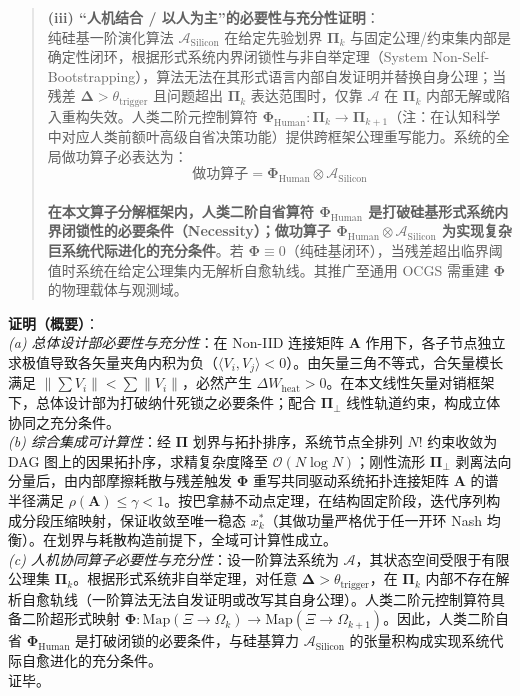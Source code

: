 \documentclass[
]{article}
\begin{document}
\begin{quote}
\textbf{(iii) ``人机结合 / 以人为主''的必要性与充分性证明}：\\
纯硅基一阶演化算法 \(\mathcal{A}_{\mathrm{Silicon}}\) 在给定先验划界
\(\mathbf{\Pi}_k\)
与固定公理/约束集内部是确定性闭环，根据形式系统内界闭锁性与非自举定理（System
Non-Self-Bootstrapping），算法无法在其形式语言内部自发证明并替换自身公理；当残差
\(\mathbf{\Delta} > \theta_{\mathrm{trigger}}\) 且问题超出
\(\mathbf{\Pi}_k\) 表达范围时，仅靠 \(\mathcal{A}\) 在
\(\mathbf{\Pi}_k\) 内部无解或陷入重构失效。人类二阶元控制算符
\(\mathbf{\Phi}_{\mathrm{Human}}: \mathbf{\Pi}_k \to \mathbf{\Pi}_{k+1}\)（注：在认知科学中对应人类前额叶高级自省决策功能）提供跨框架公理重写能力。系统的全局做功算子必表达为：\\
\[\text{做功算子} = \mathbf{\Phi}_{\mathrm{Human}} \otimes \mathcal{A}_{\mathrm{Silicon}}\]\\
\textbf{在本文算子分解框架内，人类二阶自省算符
\(\mathbf{\Phi}_{\mathrm{Human}}\)
是打破硅基形式系统内界闭锁性的必要条件（Necessity）；做功算子
\(\mathbf{\Phi}_{\mathrm{Human}} \otimes \mathcal{A}_{\mathrm{Silicon}}\)
为实现复杂巨系统代际进化的充分条件}。若
\(\mathbf{\Phi} \equiv 0\)（纯硅基闭环），当残差超出临界阈值时系统在给定公理集内无解析自愈轨线。其推广至通用
OCGS 需重建 \(\mathbf{\Phi}\) 的物理载体与观测域。
\end{quote}

\textbf{证明（概要）}：\\
\emph{(a) 总体设计部必要性与充分性}：在 Non-IID 连接矩阵 \(\mathbf{A}\)
作用下，各子节点独立求极值导致各矢量夹角内积为负（\(\langle V_i, V_j \rangle < 0\)）。由矢量三角不等式，合矢量模长满足
\(\left\|\sum V_i\right\| < \sum \|V_i\|\)，必然产生
\(\Delta W_{\text{heat}} > 0\)。在本文线性矢量对销框架下，总体设计部为打破纳什死锁之必要条件；配合
\(\mathbf{\Pi}_\bot\) 线性轨道约束，构成立体协同之充分条件。\\
\emph{(b) 综合集成可计算性}：经 \(\mathbf{\Pi}\)
划界与拓扑排序，系统节点全排列 \(N!\) 约束收敛为 DAG
图上的因果拓扑序，求精复杂度降至 \(\mathcal{O}(N \log N)\)；刚性流形
\(\mathbf{\Pi}_\bot\) 剥离法向分量后，由内部摩擦耗散与残差触发
\(\mathbf{\Phi}\) 重写共同驱动系统拓扑连接矩阵 \(\mathbf{A}\)
的谱半径满足
\(\rho(\mathbf{A}) \le \gamma < 1\)。按巴拿赫不动点定理，在结构固定阶段，迭代序列构成分段压缩映射，保证收敛至唯一稳态
\(x_k^\ast\)（其做功量严格优于任一开环 Nash
均衡）。在划界与耗散构造前提下，全域可计算性成立。\\
\emph{(c) 人机协同算子必要性与充分性}：设一阶算法系统为
\(\mathcal{A}\)，其状态空间受限于有限公理集
\(\mathbf{\Pi}_k\)。根据形式系统非自举定理，对任意
\(\mathbf{\Delta} > \theta_{\mathrm{trigger}}\)，在 \(\mathbf{\Pi}_k\)
内部不存在解析自愈轨线（一阶算法无法自发证明或改写其自身公理）。人类二阶元控制算符具备二阶超形式映射
\(\mathbf{\Phi}: \mathrm{Map}(\Xi \to \Omega_k) \to \mathrm{Map}(\Xi \to \Omega_{k+1})\)。因此，人类二阶自省
\(\mathbf{\Phi}_{\mathrm{Human}}\) 是打破闭锁的必要条件，与硅基算力
\(\mathcal{A}_{\mathrm{Silicon}}\)
的张量积构成实现系统代际自愈进化的充分条件。\\
证毕。
\end{document}

